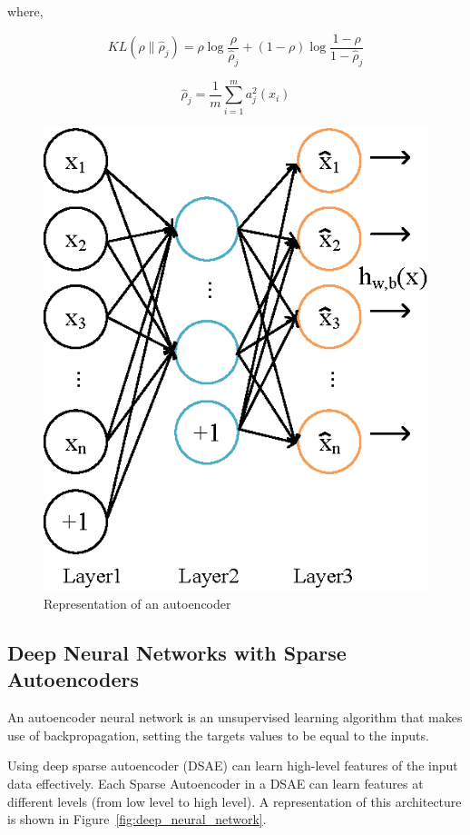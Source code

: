\documentclass{comjnl}
\begin{document}
where,

\begin{equation}
    KL(\rho\|\hat{\rho}_{j}) = \rho \log{\frac{\rho}{\hat{\rho}_{j}}} + (1-\rho) \log{\frac{1-\rho}{1-\hat{\rho}_{j}}} 
\end{equation}

\begin{equation}
    \hat{\rho}_{j} = \frac{1}{m} \sum_{i=1}^{m}{a_{j}^{2}(x_{i})}
\end{equation}

\begin{figure}
\centering
\includegraphics[width=0.58\linewidth]{figures/autoencoder.eps}
\caption{Representation of an autoencoder~\cite{Ng2011}}
\label{fig:autoencoder}
\end{figure}

\subsection{Deep Neural Networks with Sparse Autoencoders}
An autoencoder neural network is an unsupervised learning algorithm
that makes use of backpropagation, setting the targets values to be
equal to the inputs.

Using deep sparse autoencoder (DSAE) can learn high-level features
of the input data effectively. Each Sparse Autoencoder in a DSAE can
learn features at different levels (from low level to high level). A
representation of this architecture is shown in
Figure~\ref{fig:deep_neural_network}.
\end{document}
